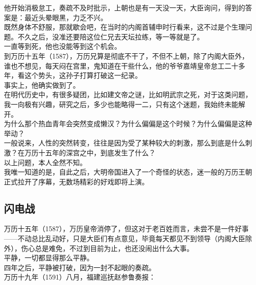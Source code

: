\begin{multicols}{\theparacolNo}
他开始消极怠工，奏疏不及时批示，上朝也是有一天没一天，大臣询问，得到的答案是：最近头晕眼黑，力乏不兴。\\

既然身体不舒服，那就歇会吧，在当时的内阁首辅申时行看来，这不过是个生理问题。不久之后，没准还要陪这位仁兄去天坛拉练，等一等就是了。\\

一直等到死，他也没能等到这个机会。\\

到万历十五年（1587），万历兄算是彻底不干了，不但不上朝，除了内阁大臣外，谁也不想见，每天闷在宫里，鬼知道在干些什么，他的爷爷嘉靖皇帝怠工二十多年，看这个势头，这孙子打算打破这一纪录。\\

事实上，他确实做到了。\\

在明代历史中，有很多疑团，比如建文帝之谜，比如明武宗之死，对于这类问题，我一向极有兴趣，研究之后，多少也能略得一二，只有这个迷题，我始终未能解开。\\

为什么那个热血青年会突然变成懒汉？为什么偏偏是这个时候？为什么偏偏是这种举动？\\

一般说来，人性的突然转变，往往是因为受了某种较大的刺激，那么到底是什么刺激？在万历十五年的深宫之中，到底发生了什么？\\

以上问题，本人全然不知。\\

我唯一知道的是，自此之后，大明帝国进入了一个奇怪的状态，迷一般的万历王朝正式拉开了序幕，无数场精彩的好戏即将上演。\\

\subsection{闪电战}
万历十五年（1587），万历皇帝消停了，但这对于老百姓而言，未尝不是一件好事——不动总比乱动好，只是大臣们有点意见，毕竟每天都见不到领导（内阁大臣除外），伤心总是难免，不过到目前为止，也还没闹出什么大事。\\

平静，一切都显得那么平静。\\

四年之后，平静被打破，因为一封不起眼的奏疏。\\

万历十九年（1591）八月，福建巡抚赵参鲁奏报：\\


\end{multicols}
